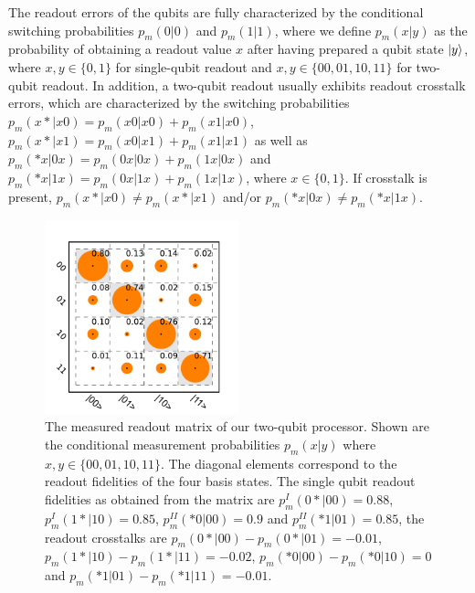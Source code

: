 The readout errors of the qubits are fully characterized by the conditional switching probabilities $p_m(0|0)$ and $p_m(1|1)$, where we define $p_m(x|y)$ as the probability of obtaining a readout value $x$ after having prepared a qubit state $\left| y \right>$, where $x,y\in\{0,1\}$ for single-qubit readout and $x,y\in\{00,01,10,11\}$ for two-qubit readout. In addition, a two-qubit readout usually exhibits readout crosstalk errors, which are characterized by the switching probabilities $p_m(x*|x0)=p_m(x0|x0)+p_m(x1|x0)$, $p_m(x*|x1)=p_m(x0|x1)+p_m(x1|x1)$ as well as $p_m(*x|0x)=p_m(0x|0x)+p_m(1x|0x)$ and $p_m(*x|1x)=p_m(0x|1x)+p_m(1x|1x)$, where $x\in\{0,1\}$. If crosstalk is present, $p_m(x*|x0) \ne p_m(x*|x1)$ and/or $p_m(*x|0x) \ne p_m(*x|1x)$.

\smallskip

\begin{figure}
	\centering
	\includegraphics[width=0.5\textwidth]{"./data/ct5/2011_04_21 - grover and tomo/good_data/readout_matrix_no_shelving"}
	\caption{The measured readout matrix of our two-qubit processor. Shown are the conditional measurement probabilities $p_m(x|y)$ where $x,y\in\{00,01,10,11\}$. The diagonal elements correspond to the readout fidelities of the four basis states. The single qubit readout fidelities as obtained from the matrix are $p_m^I(0*|00)=0.88$, $p_m^I(1*|10)=0.85$, $p_m^{II}(*0|00)=0.9$ and $p_m^{II}(*1|01)=0.85$, the readout crosstalks are $p_m(0*|00) - p_m(0*|01)=-0.01$, $p_m(1*|10) - p_m(1*|11)=-0.02$, $p_m(*0|00) - p_m(*0|10)=0$ and $p_m(*1|01) - p_m(*1|11)=-0.01$.}
	\label{fig:readout_matrix_no_shelving}
\end{figure}

